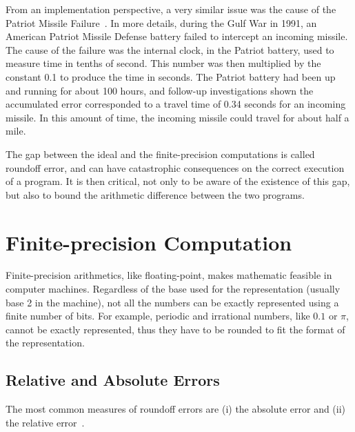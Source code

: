 From an implementation perspective, a very similar issue was the cause of the Patriot Missile Failure~\cite{patriot}.
%
In more details, during the Gulf War in 1991, an American Patriot Missile Defense battery failed to intercept an incoming missile.
%
The cause of the failure was the internal clock, in the Patriot battery, used to measure time in tenths of second.
%
This number was then multiplied by the constant 0.1 to produce the time in seconds.
%
The Patriot battery had been up and running for about 100 hours, and follow-up investigations shown the accumulated error corresponded to a travel time of 0.34 seconds for an incoming missile. 
%
In this amount of time, the incoming missile could travel for about half a mile.

%
The gap between the ideal and the finite-precision computations is called roundoff error, and can have catastrophic consequences on the correct execution of a program.
%
It is then critical, not only to be aware of the existence of this gap, but also to bound the arithmetic difference between the two programs.
%
\section{Finite-precision Computation}
%

Finite-precision arithmetics, like floating-point, makes mathematic feasible in computer machines. 
%
Regardless of the base used for the representation (usually base 2 in the machine), not all the numbers can be exactly represented using a finite number of bits.
%
For example, periodic and irrational numbers, like $0.1$ or $\pi$, cannot be exactly represented, thus they have to be rounded to fit the format of the representation. 
%
%
\subsection{Relative and Absolute Errors}
%
The most common measures of roundoff errors are (i) the absolute error and (ii) the relative error~\cite{higham2002accuracy}.
%

